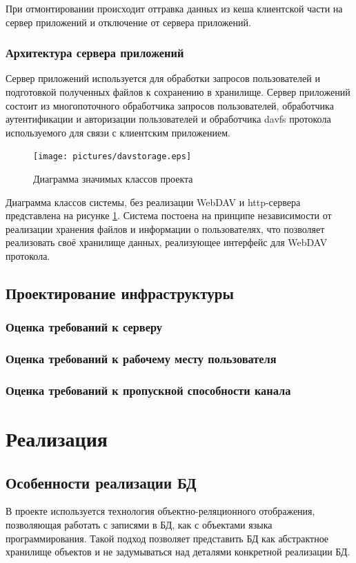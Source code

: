 \documentclass[utf8,usehyperref,12pt]{G7-32}
\begin{document}
При отмонтировании происходит оттравка данных из кеша клиентской части на сервер приложений и отключение от сервера приложений.

\subsection{Архитектура сервера приложений}

Сервер приложений используется для обработки запросов пользователей и подготовкой полученных файлов к сохранению в хранилище. Сервер приложений состоит из многопоточного обработчика запросов пользователей, обработчика аутентификации и авторизации пользователей и обработчика davfs протокола используемого для связи с клиентским приложением.

\begin{figure}[ht]
   \centering%
   \texttt{[image: pictures/davstorage.eps]}
   \caption{Диаграмма значимых классов проекта}\label{fig:davstorage}
 \end{figure}
 
 Диаграмма классов системы, без реализации WebDAV и http-сервера представлена на рисунке \ref{fig:davstorage}. Система постоена на принципе независимости от реализации хранения файлов и информации о пользователях, что позволяет реализовать своё хранилище данных, реализующее интерфейс для WebDAV протокола.

\section{Проектирование инфраструктуры}
\subsection{Оценка требований к серверу}
\subsection{Оценка требований к рабочему месту пользователя}
\subsection{Оценка требований к пропускной способности канала}

\chapter{Реализация}
\section{Особенности реализации БД}
В проекте используется технология объектно-реляционного отображения, позволяющая работать с записями в БД, как с объектами языка программирования. Такой подход позволяет представить БД как абстрактное хранилище объектов и не задумываться над деталями конкретной реализации БД. 
\end{document}
